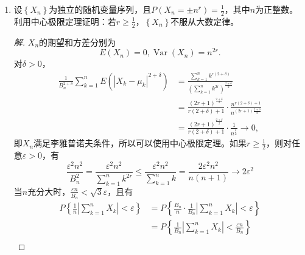 \documentclass[12pt]{article}
\newcommand{\hei}{\CJKfamily{hei}}                          %
\begin{document}
\begin{enumerate}
\item {\hei 设$ \left\{ {{X}_{n}} \right\} $为独立的随机变量序列，且$ P\left( {{X}_{n}}=\pm {{n}^{r}} \right)=\displaystyle{\frac{1}{2}} $，其中$ n $为正整数。利用中心极限定理证明：若$ r\geq  \displaystyle{\frac{1}{2}} $，$ \left\{ {{X}_{n}} \right\} $不服从大数定律。}
\begin{proof}[解]
	$  {{X}_{n}}  $的期望和方差分别为
	\begin{equation}
		E\left( {{X}_{n}} \right)=0,\operatorname{Var}\left( {{X}_{n}} \right)={{n}^{2r}}.
	\end{equation}
	对$ \delta > 0 $，
	\begin{equation}
		\begin{aligned}
			\frac{1}{B_{n}^{2+\delta }}\sum\limits_{k=1}^{n}{E\left( {{\left| {{X}_{k}}-{{\mu }_{k}} \right|}^{2+\delta }} \right)} &=\frac{\sum\limits_{k=1}^{n}{{{k}^{r\left( 2+\delta  \right)}}}}{{{\left( \sum\limits_{k=1}^{n}{{{k}^{2r}}} \right)}^{\frac{2+\delta }{2}}}} \\ 
			& =\frac{{{\left( 2r+1 \right)}^{\frac{2+\delta }{2}}}}{r\left( 2+\delta  \right)+1}\cdot \frac{{{n}^{r\left( 2+\delta  \right)+1}}}{{{n}^{\left( 2r+1 \right)\frac{2+\delta }{2}}}} \\ 
			& =\frac{{{\left( 2r+1 \right)}^{\frac{2+\delta }{2}}}}{r\left( 2+\delta  \right)+1}\cdot \frac{1}{{{n}^{\frac{\delta }{2}}}} \longrightarrow 0,
		\end{aligned}
	\end{equation}
	即$  {{X}_{n}}  $满足李雅普诺夫条件，所以可以使用中心极限定理。如果$ r\geq  \displaystyle{\frac{1}{2}} $，则对任意$ \varepsilon>0 $，有
	\begin{equation}
		\frac{{{\varepsilon }^{2}}{{n}^{2}}}{B_{n}^{2}}=\frac{{{\varepsilon }^{2}}{{n}^{2}}}{\sum\limits_{k=1}^{n}{{{k}^{2r}}}}\le \frac{{{\varepsilon }^{2}}{{n}^{2}}}{\sum\limits_{k=1}^{n}{k}}=\frac{2{{\varepsilon }^{2}}{{n}^{2}}}{n\left( n+1 \right)} \longrightarrow 2{{\varepsilon }^{2}}
	\end{equation}
	当$ n $充分大时，$ \displaystyle{\frac{\varepsilon n}{{{B}_{n}}}}<\sqrt{3}\varepsilon  $，且有
	\begin{equation}
		\begin{aligned}
			P\left\{ \frac{1}{n}\left| \sum\limits_{k=1}^{n}{{{X}_{k}}} \right|<\varepsilon  \right\} &=P\left\{ \frac{{{B}_{n}}}{n}\cdot \frac{1}{{{B}_{n}}}\left| \sum\limits_{k=1}^{n}{{{X}_{k}}} \right|<\varepsilon  \right\} \\ 
			& =P\left\{ \frac{1}{{{B}_{n}}}\left| \sum\limits_{k=1}^{n}{{{X}_{k}}} \right|<\frac{\varepsilon n}{{{B}_{n}}} \right\} \\ 

\end{aligned}
\end{equation}
\end{proof}
\end{enumerate}
\end{document}
